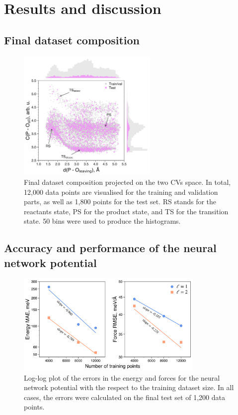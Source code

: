 \chapter{Results and discussion}

\section{Final dataset composition}

\begin{figure}[ht]
    \centering
    \includegraphics[width=0.6\textwidth]{Figures/4_Results/results_final_dataset_with_histograms.png}
    \caption{Final dataset composition projected on the two CVs space. In total, 12,000 data points are visualised for the training and validation parts, as well as 1,800 points for the test set. RS stands for the reactants state, PS for the product state, and TS for the transition state. 50 bins were used to produce the histograms.}
    \label{fig:final_dataset}
\end{figure}


\clearpage
\section{Accuracy and performance of the neural network potential}

\begin{figure}[ht]
    \centering
    \includegraphics[width=0.8\textwidth]{Figures/4_Results/results_nnp_loglog_energy_force.png}
    \caption{Log-log plot of the errors in the energy and forces for the neural network potential with the respect to the training dataset size. In all cases, the errors were calculated on the final test set of 1,200 data points.}
    \label{fig:nnp_log-log}
\end{figure}

